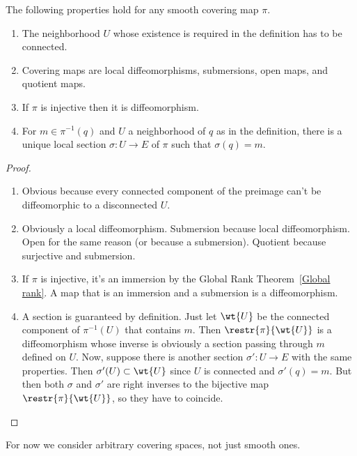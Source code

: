 \begin{prop}The following properties hold for any smooth covering map $\pi$.
\begin{enumerate}
    \item The neighborhood $U$ whose existence is required in the definition has to be connected.
    \item Covering maps are local diffeomorphisms, submersions, open maps, and quotient maps.
    \item If $\pi $ is injective then it is diffeomorphism.
    \item For $m\in \pi^{-1}(q)$ and $U$ a neighborhood of $q$ as in the definition, there is a unique local section $\sigma:U\to E$ of $\pi$ such that $\sigma(q)=m$.
\end{enumerate}
\end{prop}
\begin{proof}
\begin{enumerate}
    \item Obvious because every connected component of the preimage can't be diffeomorphic to a disconnected $U$.
    \item Obviously a local diffeomorphism. Submersion because local diffeomorphism. Open for the same reason (or because a submersion). Quotient because surjective and submersion.
    \item If $\pi$ is injective, it's an immersion by the Global Rank Theorem~\ref{Global rank}. A map that is an immersion and a submersion is a diffeomorphism.
    \item A section is guaranteed by definition. Just let $\wt{U}$ be the connected component of $\pi^{-1}(U)$ that contains $m$. Then $\restr{\pi}{\wt{U}}$ is a diffeomorphism whose inverse is obviously a section passing through $m$ defined on $U$. Now, suppose there is another section $\sigma':U\to E$ with the same properties. Then $\sigma'(U)\subset \wt{U}$ since $U$ is connected and $\sigma'(q)=m$. But then both $\sigma$ and $\sigma'$ are right inverses to the bijective map $\restr{\pi}{\wt{U}}$, so they have to coincide.
\end{enumerate}
\end{proof}

For now we consider arbitrary covering spaces, not just smooth ones.

